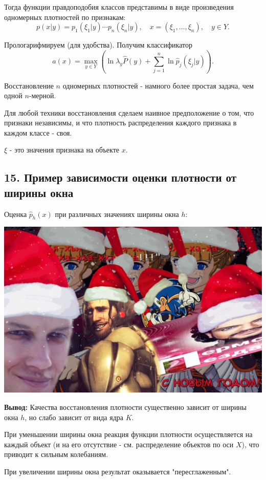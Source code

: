 Тогда функции правдоподобия классов представимы в виде произведения
одномерных плотностей по признакам:
$$p{(x \vert y)} = p_1{(\xi_1 | y)} \cdots p_n{(\xi_n \vert y)}, \quad x = {(\xi_1, \ldots, \xi_n)}, \quad y \in Y.$$

Прологарифмируем (для удобства).
Получим классификатор
$$a{(x)} = \max_{y \in Y}{\left( \ln{\lambda_y \hat{P}{(y)}} + \sum_{j=1}^{n}{\ln{\hat{p}_j{(\xi_j \vert y)}}} \right)}.$$

Восстановление $n$ одномерных плотностей - намного более простая задача, чем
одной $n$-мерной.

Для любой техники восстановления сделаем наивное предположение о том, что
признаки независимы, и что плотность распределения каждого признака в
каждом классе - своя.

$\xi$ - это значения признака на объекте $x$.

\subsection{15. Пример зависимости оценки плотности от ширины окна}

Оценка $\hat{p}_h{(x)}$ при различных значениях ширины окна $h$:

\includegraphics[scale=0.3]{figures/samplefigure.jpg}

\textbf{Вывод:} Качества восстановления плотности существенно зависит от ширины
окна $h$, но слабо зависит от вида ядра $K$.

При уменьшении ширины окна реакция функции плотности осуществляется на
каждый объект (и на его отсутствие - см. распределение объектов по оси $X$),
что приводит к сильным колебаниям.

При увеличении ширины окна результат оказывается "пересглаженным".

